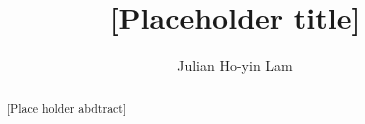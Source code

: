 \documentclass[]{report}
\title{[Placeholder title]}
\author{Julian Ho-yin Lam}
\begin{document}

\setcounter{page}{0}

\begin{abstract}
[Place holder abdtract]
\end{abstract}
\tableofcontents
\listoffigures
\listoftables
\setcounter{page}{0}










\end{document}
